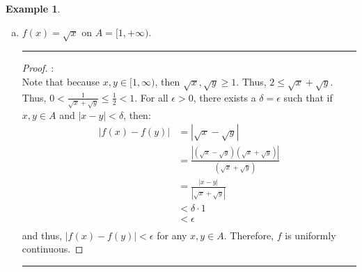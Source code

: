 \documentclass[openany, amssymb, psamsfonts]{amsart}
\theoremstyle{definition}
\newtheorem{exmp}{Example}[section]
\numberwithin{equation}{section}
\begin{document}
\begin{exmp}
\begin{enumerate}[(a)]
\begin{proof}
\begin{align*}
            &< \epsilon
\end{align*}
and thus, $|f(x) - f(y)|< \epsilon$ for any $x,y \in A$. Therefore, $f$ is uniformly continuous.
\end{proof} \vspace{4pt}     \hrule   \vspace{4pt}
		\item $f(x) = \sqrt{x}$ on $A = [1, + \infty)$.
\vspace{4pt}     \hrule   \vspace{4pt} \begin{proof}:\\
Note that because $x,y \in [1,\infty)$, then $\sqrt{x}, \sqrt{y}\geq 1$. Thus, $2\leq \sqrt{x}+ \sqrt{y}$. Thus, $0<\frac{1}{\sqrt{x}+\sqrt{y}}\leq \frac{1}{2}<1$. For all $\epsilon>0$, there exists a $\delta = \epsilon$ such that if $x,y\in A$ and $|x-y|<\delta$, then:
\begin{align*}
|f(x) - f(y)|&= |\sqrt{x} - \sqrt{y}|\\
            &= \frac{|(\sqrt{x}-\sqrt{y})(\sqrt{x}+\sqrt{y})|}{(\sqrt{x}+\sqrt{y})}\\
            &= \frac{|x-y|}{|\sqrt{x}+\sqrt{y}|}\\
            &< \delta \cdot 1\\
            &< \epsilon\\
\end{align*}
and thus, $|f(x) - f(y)|< \epsilon$ for any $x,y \in A$. Therefore, $f$ is uniformly continuous.
\end{proof} \vspace{4pt}     \hrule   \vspace{4pt}
	\end{enumerate}
\end{exmp}
\end{document}
